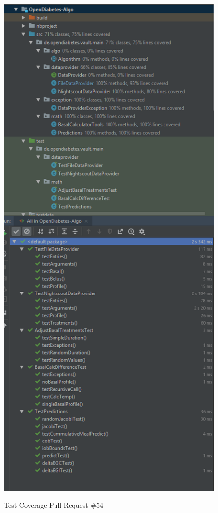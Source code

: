 \documentclass[accentcolor=tud0b,12pt,paper=a4]{tudreport}
\begin{document}
\begin{figure}[h]
\centering
\caption{Test Coverage Pull Request \#54}
\includegraphics[width=\textwidth,height=\textheight,keepaspectratio]{pr-cov-54}
\label{pr-cov:54}
\end{figure}
	
\end{document}

